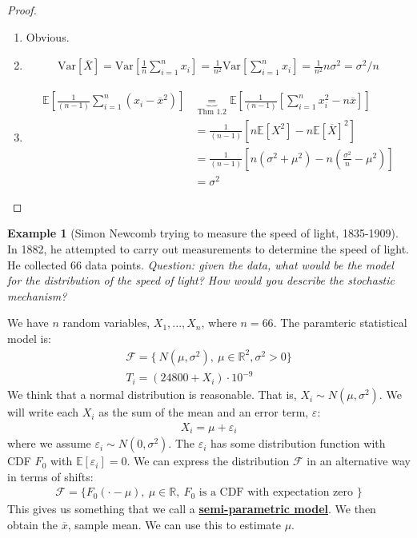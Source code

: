 \documentclass[11pt]{scrartcl}
\newcommand{\R}[0]{\mathbb{R}}
\theoremstyle{definition}
\newtheorem{ex}{Example}
\theoremstyle{remark}
\newcommand{\dfn}[1]{\textbf{\underline{#1}}}
\newcommand{\dist}[0]{\mathcal{F}}
\newcommand{\EX}[1]{\mathbb{E}\left[#1 \right]}
\begin{document}
{\begin{proof}
	\begin{enumerate}[noitemsep]
		\item Obvious. 
		\item 
		\begin{align*}
			\text{Var}[\overline{X}] = \text{Var} \left[ \frac{1}{n} \sum_{i=1}^n x_i \right] = \frac{1}{n^2} \text{Var} \left[ \sum_{i=1}^n x_i \right] = \frac{1}{n^2} n \sigma^2 = \sigma^2/n	
		\end{align*}
		\item 
		\begin{align*}
			\EX{\frac{1}{(n-1)} \sum_{i=1}^n (x_i - \overline{x}^2) } & \underbrace{=}_{\text{Thm 1.2}}  \EX{\frac{1}{(n-1)} \left[ 	\sum_{i=1}^n x_i^2 - n \overline{x} 	\right] }	 \\
				& = \frac{1}{(n-1)} \left[ 	n \EX{X^2} - n \EX{\overline{X}}^2	\right] \\
				& = \frac{1}{(n-1)} \left[ 		n ( \sigma^2	 + \mu^2) - n \left( 	\frac{\sigma^2}{n} - \mu^2	\right) \right]  \\
				& = \sigma^2
		\end{align*}
	\end{enumerate}
\end{proof}

\begin{ex}[Simon Newcomb trying to measure the speed of light, 1835-1909] In 1882, he attempted to carry out measurements to determine the speed of light. He collected 66 data points. \emph{Question: given the data, what would be the model for the distribution of the speed of light? How would you describe the stochastic mechanism?} 

We have $n$ random variables, $X_1, ..., X_n$, where $n=66$. The paramteric statistical model is: 
\begin{align*}
	\dist = \{\ N(\mu, \sigma^2),\ \mu \in \R^2, \sigma^2 > 0 \} 	\\
	T_i = (24800 + X_i) \cdot 10^{-9} 
\end{align*}
We think that a normal distribution is reasonable. That is, $X_i \sim N(\mu, \sigma^2)$. We will write each $X_i$ as the sum of the mean and an error term, $\varepsilon$: 
\begin{align*}
	X_i = \mu + \varepsilon_i 	
\end{align*}
where we assume $\varepsilon_i \sim N(0, \sigma^2)$. The $\varepsilon_i$ has some distribution function with CDF $F_0$ with $\EX{ \varepsilon_i } = 0$. We can express the distribution $\dist$ in an alternative way in terms of shifts: 
\begin{align*}
\dist = \{ F_0 ( \cdot - \mu),\ \mu \in \R,\ F_0 \text{ is a CDF with expectation zero } \} 	
\end{align*}
This gives us something that we call a \dfn{semi-parametric model}. We then obtain the $\overline{x}$, sample mean. We can use this to estimate $\mu$. 


\end{ex}}
\end{document}
